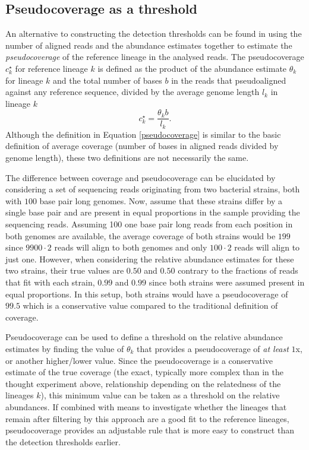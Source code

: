 \documentclass[officiallayout]{tktla}
\begin{document}
\subsection{Pseudocoverage as a threshold}

An alternative to constructing the detection thresholds can be found
in using the number of aligned reads and the abundance estimates
together to estimate the \textit{pseudocoverage} of the reference
lineage in the analysed reads. The pseudocoverage $c^{\star}_{k}$ for
reference lineage $k$ is defined as the product of the abundance
estimate $\theta_{k}$ for lineage $k$ and the total number of bases
$b$ in the reads that pseudoaligned against any reference sequence,
divided by the average genome length $l_{k}$ in lineage $k$
\begin{equation}
  \label{pseudocoverage}
  c_{k}^{\star} = \frac{\theta_{k}b}{l_{k}}.
\end{equation}
Although the definition in Equation \ref{pseudocoverage} is similar to
the basic definition of average coverage (number of bases in aligned
reads divided by genome length), these two definitions are not
necessarily the same.

The difference between coverage and pseudocoverage can be elucidated
by considering a set of sequencing reads originating from two
bacterial strains, both with $100$ base pair long genomes. Now, assume
that these strains differ by a single base pair and are present in
equal proportions in the sample providing the sequencing
reads. Assuming 100 one base pair long reads from each
position in both genomes are available, the average coverage of both strains would
be $199$ since $9900\cdot2$ reads will align to both genomes and only
$100\cdot2$ reads will align to just one. However, when considering
the relative abundance estimates for these two strains, their true
values are $0.50$ and $0.50$ \textemdash{ } contrary to the fractions
of reads that fit with each strain, $0.99$ and $0.99$ \textemdash{ }
since both strains were assumed present in equal proportions. In
this setup, both strains would have a pseudocoverage of $99.5$ which
is a conservative value compared to the traditional definition of
coverage.

Pseudocoverage can be used to define a threshold on the relative
abundance estimates by finding the value of $\theta_{k}$ that provides
a pseudocoverage of \textit{at least} $1$x, or another higher/lower
value. Since the pseudocoverage is a conservative estimate of the true
coverage (the exact, typically more complex than in the thought
experiment above, relationship depending on the relatedness of the
lineages $k$), this minimum value can be taken as a threshold on the
relative abundances. If combined with means to investigate whether the
lineages that remain after filtering by this approach are a good fit
to the reference lineages, pseudocoverage provides an adjustable rule
that is more easy to construct than the detection thresholds earlier.
\end{document}
